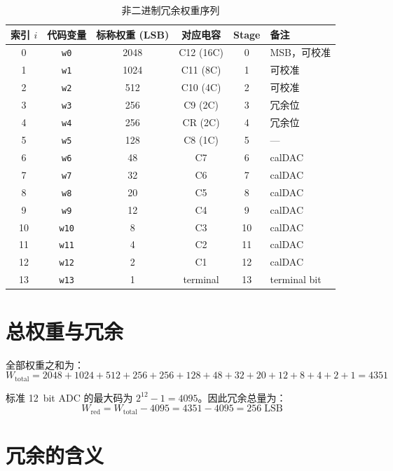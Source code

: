 \documentclass[
  UTF8,
  a4paper,
  11pt,
  oneside,
  fontset=fandol
]{ctexrep}
\newcommand{\code}[1]{\texttt{#1}}
\newcommand{\Wtotal}{W_{\mathrm{total}}}
\newcommand{\Wred}{W_{\mathrm{red}}}
\begin{document}
\begin{table}[H]
\centering
\caption{非二进制冗余权重序列}
\label{tab:weights}
\small
\begin{tabularx}{\textwidth}{c c c c c X}
\toprule
索引 $i$ & 代码变量 & 标称权重 (LSB) & 对应电容 & Stage & 备注 \\
\midrule
0 & \code{w0}  & 2048 & C12 (16C) & 0  & MSB，可校准 \\
1 & \code{w1}  & 1024 & C11 (8C)  & 1  & 可校准 \\
2 & \code{w2}  & 512  & C10 (4C)  & 2  & 可校准 \\
3 & \code{w3}  & 256  & C9 (2C)   & 3  & 冗余位 \\
4 & \code{w4}  & 256  & CR (2C)   & 4  & 冗余位 \\
5 & \code{w5}  & 128  & C8 (1C)   & 5  & --- \\
6 & \code{w6}  & 48   & C7        & 6  & calDAC \\
7 & \code{w7}  & 32   & C6        & 7  & calDAC \\
8 & \code{w8}  & 20   & C5        & 8  & calDAC \\
9 & \code{w9}  & 12   & C4        & 9  & calDAC \\
10 & \code{w10} & 8    & C3        & 10 & calDAC \\
11 & \code{w11} & 4    & C2        & 11 & calDAC \\
12 & \code{w12} & 2    & C1        & 12 & calDAC \\
13 & \code{w13} & 1    & terminal  & 13 & terminal bit \\
\bottomrule
\end{tabularx}
\end{table}

\section{总权重与冗余}

全部权重之和为：
\begin{equation}
\Wtotal = 2048 + 1024 + 512 + 256 + 256 + 128 + 48 + 32 + 20 + 12 + 8 + 4 + 2 + 1 = 4351
\label{eq:wtotal}
\end{equation}

标准 \SI{12}{bit} ADC 的最大码为 $2^{12} - 1 = 4095$。因此冗余总量为：
\begin{equation}
\Wred = \Wtotal - 4095 = 4351 - 4095 = 256 \;\text{LSB}
\label{eq:wred}
\end{equation}

\section{冗余的含义}
\end{document}
